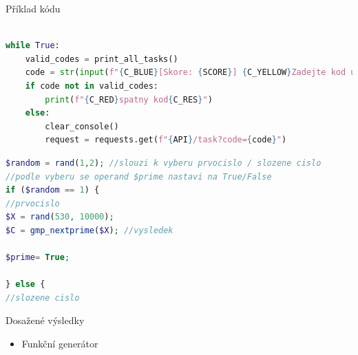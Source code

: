 \documentclass[aspectratio=1610]{beamer}
\begin{document}


\begin{frame}[fragile]{Příklad kódu}

\begin{lstlisting}[language=python,title={Příklad Python kódu}]

while True:
    valid_codes = print_all_tasks()
    code = str(input(f"{C_BLUE}[Skore: {SCORE}] {C_YELLOW}Zadejte kod ulohy, kterou si prejete resit:{C_RES}"))
    if code not in valid_codes:
        print(f"{C_RED}spatny kod{C_RES}")
    else:    
        clear_console()
        request = requests.get(f"{API}/task?code={code}")
\end{lstlisting}
    \vfill

\begin{lstlisting}[language=php,title={Příklad PHP kódu}]
$random = rand(1,2); //slouzi k vyberu prvocislo / slozene cislo
//podle vyberu se operand $prime nastavi na True/False
if ($random == 1) {
//prvocislo
$X = rand(530, 10000);
$C = gmp_nextprime($X); //vysledek

$prime= True;

} else {
//slozene cislo
\end{lstlisting}


\end{frame}

\begin{frame}{Dosažené výsledky}
    \begin{itemize}
        \item Funkční generátor
    \end{itemize}
\end{frame}


\end{document}
